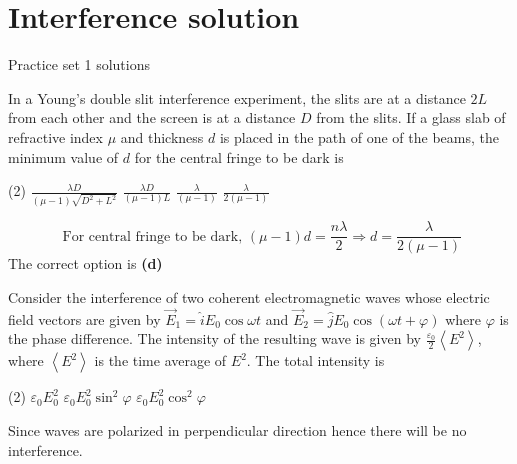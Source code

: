 \chapter{Interference solution}
\begin{abox}
	Practice set 1 solutions
	\end{abox}
\begin{enumerate}
\begin{minipage}{\textwidth}
	\item In a Young's double slit interference experiment, the slits are at a distance $2 L$ from each other and the screen is at a distance $D$ from the slits. If a glass slab of refractive index $\mu$ and thickness $d$ is placed in the path of one of the beams, the minimum value of $d$ for the central fringe to be dark is
\end{minipage}
\begin{tasks}(2)
	\task[\textbf{A.}] $\frac{\lambda D}{(\mu-1) \sqrt{D^{2}+L^{2}}}$
	\task[\textbf{B.}] $\frac{\lambda D}{(\mu-1) L}$
	\task[\textbf{C.}]$\frac{\lambda}{(\mu-1)}$
	\task[\textbf{D.}]$\frac{\lambda}{2(\mu-1)}$
\end{tasks}
\begin{answer}
	$$\text { For central fringe to be dark, }(\mu-1) d=\frac{n \lambda}{2} \Rightarrow d=\frac{\lambda}{2(\mu-1)}$$
	The correct option is \textbf{(d)}	
\end{answer}
\begin{minipage}{\textwidth}
	\item Consider the interference of two coherent electromagnetic waves whose electric field vectors are given by $\vec{E}_{1}=\hat{i} E_{0} \cos \omega t$ and $\vec{E}_{2}=\hat{j} E_{0} \cos (\omega t+\varphi)$ where $\varphi$ is the phase difference. The intensity of the resulting wave is given by $\frac{\varepsilon_{0}}{2}\left\langle E^{2}\right\rangle$, where $\left\langle E^{2}\right\rangle$ is the time average of $E^{2}$. The total intensity is
\end{minipage}
\begin{tasks}(2)
	\task[\textbf{B.}]$\varepsilon_{0} E_{0}^{2}$
	\task[\textbf{C.}] $\varepsilon_{0} E_{0}^{2} \sin ^{2} \varphi$
	\task[\textbf{D.}] $\varepsilon_{0} E_{0}^{2} \cos ^{2} \varphi$
\end{tasks}
\begin{answer}
	Since waves are polarized in perpendicular direction hence there will be no interference.\\

\end{answer}
\end{enumerate}
